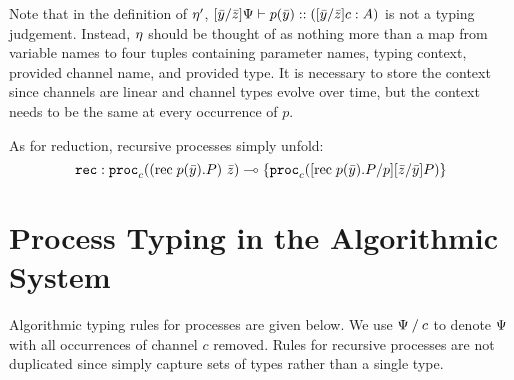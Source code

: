 \documentclass[a4paper,USenglish]{lipics-v2016}
\begin{document}

Note that in the definition of $\eta'$, $\lbrack{\bar{y}}/{\bar{z}}\rbrack{\Psi} \vdash {p}(\bar{y}) :: (\lbrack{\bar{y}}/{\bar{z}}\rbrack{c} : A)$ is not a typing judgement. Instead, $\eta$ should be thought of as nothing more than a map from variable names to four tuples containing parameter names, typing context, provided channel name, and provided type. It is necessary to store the context since channels are linear and channel types evolve over time, but the context needs to be the same at every occurrence of $p$.

As for reduction, recursive processes simply unfold:
$$ \texttt{rec} : \mathtt{proc}_{c}({(\mathrm{rec}\; {p}(\bar{y}) . {P})}~{\bar{z}})
     \multimap \lbrace \mathtt{proc}_{c}(\lbrack{\mathrm{rec}\; {p}(\bar{y}) . {P}}/{p}\rbrack{\lbrack{\bar{z}}/{\bar{y}}\rbrack{P}}) \rbrace
$$


\section{Process Typing in the Algorithmic System}
\label{optional-algorithmic}

Algorithmic typing rules for processes are given below. We use $\Psi \mathbin{/} c$ to denote $\Psi$ with all occurrences of channel $c$ removed. Rules for recursive processes are not duplicated since simply capture sets of types rather than a single type.
\end{document}
